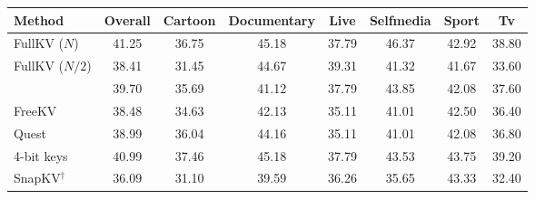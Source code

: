 \begin{tabular}{l|ccccccc}
\toprule
\textbf{Method} & Overall & Cartoon & Documentary & Live & Selfmedia & Sport & Tv \\
\midrule
FullKV ($N$) & 41.25 & 36.75 & 45.18 & 37.79 & 46.37 & 42.92 & 38.80 \\
FullKV ($N/2$) & 38.41 & 31.45 & 44.67 & 39.31 & 41.32 & 41.67 & 33.60 \\
\midrule
\method{} & 39.70 & 35.69 & 41.12 & 37.79 & 43.85 & 42.08 & 37.60 \\
FreeKV & 38.48 & 34.63 & 42.13 & 35.11 & 41.01 & 42.50 & 36.40 \\
Quest & 38.99 & 36.04 & 44.16 & 35.11 & 41.01 & 42.08 & 36.80 \\
4-bit keys & 40.99 & 37.46 & 45.18 & 37.79 & 43.53 & 43.75 & 39.20 \\
SnapKV$^\dagger$ & 36.09 & 31.10 & 39.59 & 36.26 & 35.65 & 43.33 & 32.40 \\
\bottomrule
\end{tabular}
